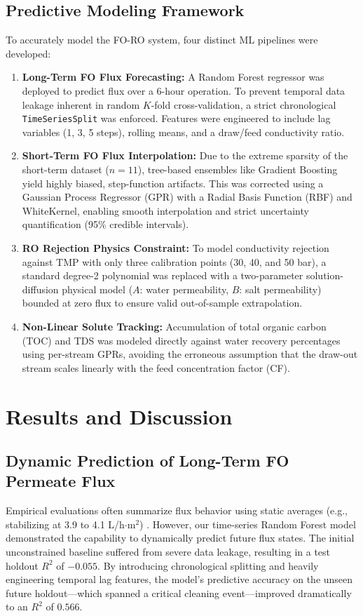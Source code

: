 \documentclass[journal, onecolumn, 12pt]{IEEEtran}
\begin{document}
\subsection{Predictive Modeling Framework}
To accurately model the FO-RO system, four distinct ML pipelines were developed:

\begin{enumerate}
    \item \textbf{Long-Term FO Flux Forecasting:} A Random Forest regressor was deployed to predict flux over a 6-hour operation. To prevent temporal data leakage inherent in random $K$-fold cross-validation, a strict chronological \texttt{TimeSeriesSplit} was enforced. Features were engineered to include lag variables (1, 3, 5 steps), rolling means, and a draw/feed conductivity ratio.
    \item \textbf{Short-Term FO Flux Interpolation:} Due to the extreme sparsity of the short-term dataset ($n=11$), tree-based ensembles like Gradient Boosting yield highly biased, step-function artifacts. This was corrected using a Gaussian Process Regressor (GPR) with a Radial Basis Function (RBF) and WhiteKernel, enabling smooth interpolation and strict uncertainty quantification (95\% credible intervals).
    \item \textbf{RO Rejection Physics Constraint:} To model conductivity rejection against TMP with only three calibration points (30, 40, and 50 bar), a standard degree-2 polynomial was replaced with a two-parameter solution-diffusion physical model ($A$: water permeability, $B$: salt permeability) bounded at zero flux to ensure valid out-of-sample extrapolation.
    \item \textbf{Non-Linear Solute Tracking:} Accumulation of total organic carbon (TOC) and TDS was modeled directly against water recovery percentages using per-stream GPRs, avoiding the erroneous assumption that the draw-out stream scales linearly with the feed concentration factor (CF).
\end{enumerate}

\section{Results and Discussion}

\subsection{Dynamic Prediction of Long-Term FO Permeate Flux}
Empirical evaluations often summarize flux behavior using static averages (e.g., stabilizing at 3.9 to 4.1 L/h$\cdot$m$^2$) \cite{b1}. However, our time-series Random Forest model demonstrated the capability to dynamically predict future flux states. The initial unconstrained baseline suffered from severe data leakage, resulting in a test holdout $R^2$ of $-0.055$. By introducing chronological splitting and heavily engineering temporal lag features, the model's predictive accuracy on the unseen future holdout---which spanned a critical cleaning event---improved dramatically to an $R^2$ of $0.566$.
\end{document}
